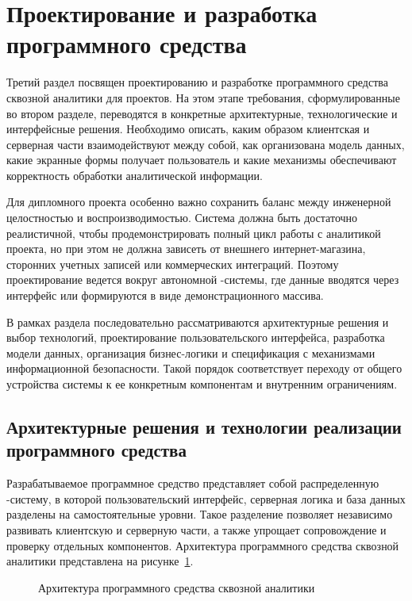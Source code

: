\section{Проектирование и разработка программного средства}

Третий раздел посвящен проектированию и разработке программного средства сквозной аналитики для  проектов. На этом этапе требования, сформулированные во втором разделе, переводятся в конкретные архитектурные, технологические и интерфейсные решения. Необходимо описать, каким образом клиентская и серверная части взаимодействуют между собой, как организована модель данных, какие экранные формы получает пользователь и какие механизмы обеспечивают корректность обработки аналитической информации.

Для дипломного проекта особенно важно сохранить баланс между инженерной целостностью и воспроизводимостью. Система должна быть достаточно реалистичной, чтобы продемонстрировать полный цикл работы с аналитикой  проекта, но при этом не должна зависеть от внешнего интернет-магазина, сторонних учетных записей или коммерческих интеграций. Поэтому проектирование ведется вокруг автономной -системы, где данные вводятся через интерфейс или формируются в виде демонстрационного массива.

В рамках раздела последовательно рассматриваются архитектурные решения и выбор технологий, проектирование пользовательского интерфейса, разработка модели данных, организация бизнес-логики и спецификация  с механизмами информационной безопасности. Такой порядок соответствует переходу от общего устройства системы к ее конкретным компонентам и внутренним ограничениям.

\subsection{Архитектурные решения и технологии реализации программного средства}

Разрабатываемое программное средство представляет собой распределенную -систему, в которой пользовательский интерфейс, серверная логика и база данных разделены на самостоятельные уровни. Такое разделение позволяет независимо развивать клиентскую и серверную части, а также упрощает сопровождение и проверку отдельных компонентов. Архитектура программного средства сквозной аналитики представлена на рисунке~\ref{fig:analytics-architecture}.

\begin{figure}[H]
    \centering
    \caption{Архитектура программного средства сквозной аналитики}
    \label{fig:analytics-architecture}
\end{figure}

